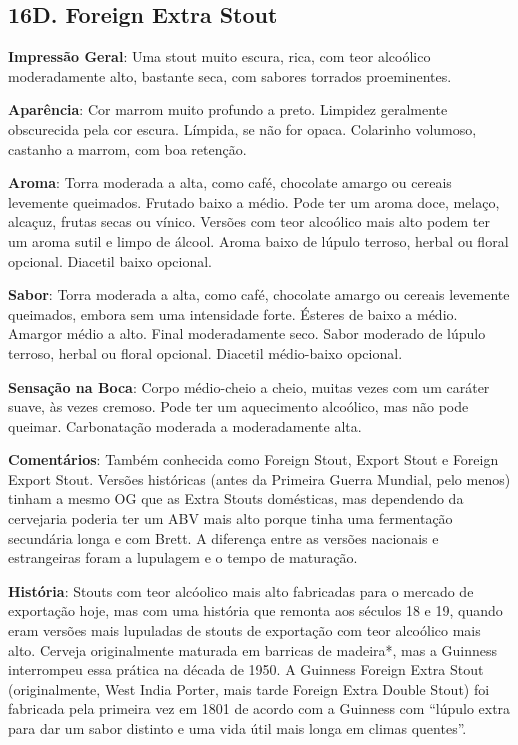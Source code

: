 \subsection*{16D. Foreign Extra Stout}
\textbf{Impressão Geral}: Uma stout muito escura, rica, com teor alcoólico moderadamente alto, bastante seca, com sabores torrados proeminentes.

\textbf{Aparência}: Cor marrom muito profundo a preto. Limpidez geralmente obscurecida pela cor escura. Límpida, se não for opaca. Colarinho volumoso, castanho a marrom, com boa retenção.

\textbf{Aroma}: Torra moderada a alta, como café, chocolate amargo ou cereais levemente queimados. Frutado baixo a médio. Pode ter um aroma doce, melaço, alcaçuz, frutas secas ou vínico. Versões com teor alcoólico mais alto podem ter um aroma sutil e limpo de álcool. Aroma baixo de lúpulo terroso, herbal ou floral opcional. Diacetil baixo opcional.

\textbf{Sabor}: Torra moderada a alta, como café, chocolate amargo ou cereais levemente queimados, embora sem uma intensidade forte. Ésteres de baixo a médio. Amargor médio a alto. Final moderadamente seco. Sabor moderado de lúpulo terroso, herbal ou floral opcional. Diacetil médio-baixo opcional.

\textbf{Sensação na Boca}: Corpo médio-cheio a cheio, muitas vezes com um caráter suave, às vezes cremoso. Pode ter um aquecimento alcoólico, mas não pode queimar. Carbonatação moderada a moderadamente alta.

\textbf{Comentários}: Também conhecida como Foreign Stout, Export Stout e Foreign Export Stout. Versões históricas (antes da Primeira Guerra Mundial, pelo menos) tinham a mesmo OG que as Extra Stouts domésticas, mas dependendo da cervejaria poderia ter um ABV mais alto porque tinha uma fermentação secundária longa e com Brett. A diferença entre as versões nacionais e estrangeiras foram a lupulagem e o tempo de maturação.

\textbf{História}: Stouts com teor alcóolico mais alto fabricadas para o mercado de exportação hoje, mas com uma história que remonta aos séculos 18 e 19, quando eram versões mais lupuladas de stouts de exportação com teor alcoólico mais alto. Cerveja originalmente maturada em barricas de madeira*, mas a Guinness interrompeu essa prática na década de 1950. A Guinness Foreign Extra Stout (originalmente, West India Porter, mais tarde Foreign Extra Double Stout) foi fabricada pela primeira vez em 1801 de acordo com a Guinness com “lúpulo extra para dar um sabor distinto e uma vida útil mais longa em climas quentes”.

